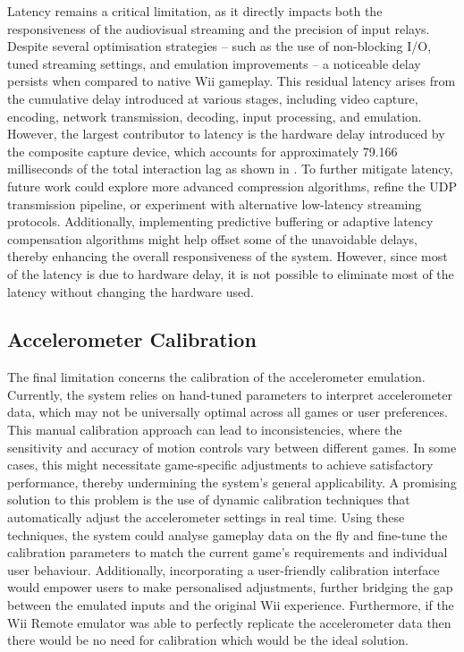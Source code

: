 Latency remains a critical limitation, as it directly impacts both the
responsiveness of the audiovisual streaming and the precision of input relays.
Despite several optimisation strategies -- such as the use of non-blocking I/O,
tuned streaming settings, and emulation improvements -- a noticeable delay
persists when compared to native Wii gameplay. This residual latency arises from
the cumulative delay introduced at various stages, including video capture,
encoding, network transmission, decoding, input processing, and emulation.
However, the largest contributor to latency is the hardware delay introduced by the composite capture device, which accounts for approximately 79.166 milliseconds of the total
interaction lag as shown in . To further
mitigate latency, future work could explore more advanced compression
algorithms, refine the UDP transmission pipeline, or experiment with alternative
low-latency streaming protocols. Additionally, implementing predictive buffering
or adaptive latency compensation algorithms might help offset some of the
unavoidable delays, thereby enhancing the overall responsiveness of the system. However, since most
of the latency is due to hardware delay, it is not possible to eliminate most of the
latency without changing the hardware used.
\subsection{Accelerometer Calibration}

The final limitation concerns the calibration of the accelerometer emulation.
Currently, the system relies on hand-tuned parameters to interpret accelerometer
data, which may not be universally optimal across all games or user preferences.
This manual calibration approach can lead to inconsistencies, where the
sensitivity and accuracy of motion controls vary between different games. In
some cases, this might necessitate game-specific adjustments to achieve
satisfactory performance, thereby undermining the system’s general
applicability. A promising solution to this problem is the use of dynamic
calibration techniques that automatically adjust the accelerometer settings in
real time. Using these techniques, the system could analyse gameplay data on the
fly and fine-tune the calibration parameters to match the current game’s
requirements and individual user behaviour. Additionally, incorporating a
user-friendly calibration interface would empower users to make personalised
adjustments, further bridging the gap between the emulated inputs and the
original Wii experience. Furthermore, if the Wii Remote emulator was able to
perfectly replicate the accelerometer data then there would be no need for
calibration which would be the ideal solution.

